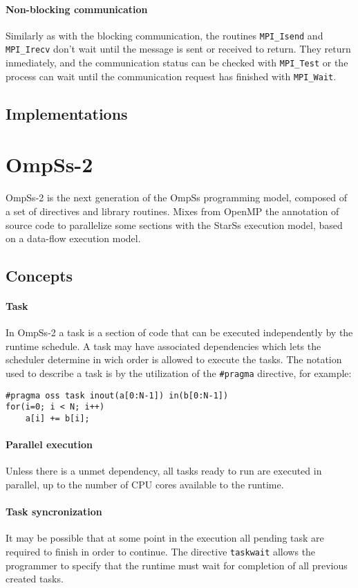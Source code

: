 \paragraph{Non-blocking communication} Similarly as with the blocking
communication, the routines \texttt{MPI\_Isend} and \texttt{MPI\_Irecv} don't
wait until the message is sent or received to return. They return inmediately,
and the communication status can be checked with \texttt{MPI\_Test} or the
process can wait until the communication request has finished with
\texttt{MPI\_Wait}.

\subsection{Implementations}


\section{OmpSs-2}

OmpSs-2 is the next generation of the OmpSs programming model, composed of a set
of directives and library routines. Mixes from OpenMP the annotation of source
code to parallelize some sections with the StarSs execution model, based on a
data-flow execution model.

\subsection{Concepts}

\paragraph{Task} In OmpSs-2 a task is a section of code that can be executed
independently by the runtime schedule. A task may have associated dependencies
which lets the scheduler determine in wich order is allowed to execute the
tasks. The notation used to describe a task is by the utilization of the
\texttt{\#pragma} directive, for example:
%
\begin{lstlisting}
#pragma oss task inout(a[0:N-1]) in(b[0:N-1])
for(i=0; i < N; i++)
	a[i] += b[i];
\end{lstlisting}
%

\paragraph{Parallel execution} Unless there is a unmet dependency, all tasks 
ready to run are executed in parallel, up to the number of CPU cores available 
to the runtime.

\paragraph{Task syncronization} It may be possible that at some point in the
execution all pending task are required to finish in order to continue. The
directive \texttt{taskwait} allows the programmer to specify that the runtime
must wait for completion of all previous created tasks.
